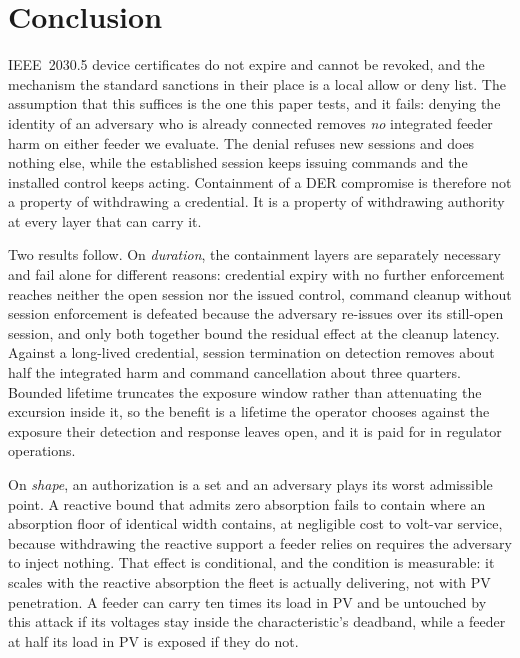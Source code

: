 \section{Conclusion}

IEEE~2030.5 device certificates do not expire and cannot be revoked, and the mechanism the
standard sanctions in their place is a local allow or deny list. The assumption that this suffices
is the one this paper tests, and it fails: denying the identity of an adversary who is already
connected removes \emph{no} integrated feeder harm on either feeder we evaluate. The denial
refuses new sessions and does nothing else, while the established session keeps issuing commands
and the installed control keeps acting. Containment of a DER compromise is therefore not a
property of withdrawing a credential. It is a property of withdrawing authority at every layer
that can carry it.

Two results follow. On \emph{duration}, the containment layers are separately necessary and fail
alone for different reasons: credential expiry with no further enforcement reaches neither the open
session nor the issued control, command cleanup without session enforcement is defeated because the
adversary re-issues over its still-open session, and only both together bound the residual effect
at the cleanup latency. Against a long-lived credential, session termination on detection removes about half the
integrated harm and command cancellation about three quarters. Bounded lifetime truncates the
exposure window rather than attenuating the excursion inside it, so the benefit is a lifetime the
operator chooses against the exposure their detection and response leaves open, and it is paid for
in regulator operations.

On \emph{shape}, an authorization is a set and an adversary plays its worst admissible point. A
reactive bound that admits zero absorption fails to contain where an absorption floor of identical
width contains, at negligible cost to volt-var service, because withdrawing the reactive support a
feeder relies on requires the adversary to inject nothing. That effect is conditional, and the
condition is measurable: it scales with the reactive absorption the fleet is actually delivering,
not with PV penetration. A feeder can carry ten times its load in PV and be untouched by this
attack if its voltages stay inside the characteristic's deadband, while a feeder at half its load
in PV is exposed if they do not.

